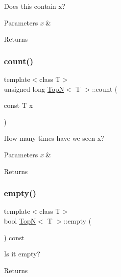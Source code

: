 Does this contain x? 


\begin{DoxyParams}{Parameters}
{\em x} & \\
\hline
\end{DoxyParams}
\begin{DoxyReturn}{Returns}

\end{DoxyReturn}
\mbox{\label{class_top_n_a8bfb8d5daa31a4fd95196cb41f0ac1ce}} 
\subsubsection{\texorpdfstring{count()}{count()}}
{\footnotesize\ttfamily template$<$class T$>$ \\
unsigned long \hyperlink{class_top_n}{TopN}$<$ T $>$\+::count (\begin{DoxyParamCaption}\item[{const T}]{x }\end{DoxyParamCaption})\hspace{0.3cm}{\ttfamily [inline]}}

How many times have we seen x? 
\begin{DoxyParams}{Parameters}
{\em x} & \\
\hline
\end{DoxyParams}
\begin{DoxyReturn}{Returns}

\end{DoxyReturn}
\mbox{\label{class_top_n_adb29d7b6490afe04adb88caac2f7fba0}} 
\subsubsection{\texorpdfstring{empty()}{empty()}}
{\footnotesize\ttfamily template$<$class T$>$ \\
bool \hyperlink{class_top_n}{TopN}$<$ T $>$\+::empty (\begin{DoxyParamCaption}{ }\end{DoxyParamCaption}) const\hspace{0.3cm}{\ttfamily [inline]}}

Is it empty? \begin{DoxyReturn}{Returns}

\end{DoxyReturn}
\mbox{\label{class_top_n_a1bc031e453f4d32cbc4cf6df04da51bc}} 
